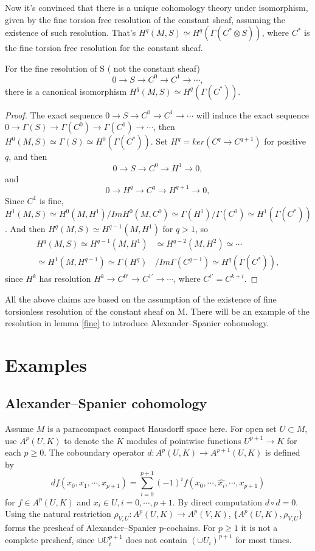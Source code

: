 \documentclass[twoside]{article}
\begin{document}
Now it's convinced that there is a unique cohomology theory under isomorphism, given by the fine torsion free resolution of the constant sheaf, assuming the existence of such resolution. That's $H^q(M,S)\simeq H^q(\Gamma(C^*\otimes S))$, where $C^*$ is the fine torsion free resolution for the constant sheaf.

\begin{theorem}\label{resdef}
For the fine resolution of S ( not the constant sheaf)   $$
0\to S\to C^0\to C^1\to \cdots,
$$
there is a  canonical isomorphism $H^q(M,S)\simeq H^q(\Gamma(C^*))$.
\end{theorem}

\begin{proof}
   The exact sequence $0\to S\to C^0\to C^1\to \cdots$ will induce the exact sequence  $0\to \Gamma(S)\to \Gamma(C^0)\to \Gamma(C^1)\to \cdots$, then $H^0(M,S)\simeq \Gamma(S)\simeq H^0(\Gamma(C^*))$.
  Set $H^q=ker(C^q\to C^{q+1})$ for positive $q$, and then
  $$
  0\to S \to C^0\to H^1\to 0,
  $$
   and
  $$
  0\to H^q\to C^q\to H^{q+1}\to 0,
  $$
 Since $C^1$ is fine, $H^1(M,S)\simeq H^0(M,H^1)/ImH^0(M,C^0)\simeq \Gamma(H^1)/\Gamma(C^0)\simeq H^1(\Gamma(C^*))$. And then
$H^q(M,S)\simeq H^{q-1}(M,H^1)$ for $q>1$, so
$$\begin{aligned}
H^q(M,S)\simeq H^{q-1}(M,H^1)&\simeq H^{q-2}(M,H^2)\simeq \cdots\\
\simeq H^1(M,H^{q-1})\simeq \Gamma(H^q)&/Im\Gamma(C^{q-1})\simeq H^q(\Gamma(C^*)),
\end{aligned}
$$
since $H^k$ has resolution $H^k\to C^{0\prime}\to C^{1\prime}\to \cdots$, where $C^{i\prime}=C^{k+i}$.
\end{proof}



\begin{remark}
  All the above claims are based on the assumption of the existence of fine torsionless resolution of the constant sheaf on M. There will be an example of the resolution in lemma \ref{fine} to introduce Alexander--Spanier cohomology.
\end{remark}
\section{Examples}
\subsection{Alexander--Spanier cohomology}
Assume $M$ is a paracompact compact Hausdorff space here. For open set $U\subset M$,  use $A^{p}(U,K)$ to denote the $K$ modules of pointwise functions $U^{p+1}\to K$ for each $p\geq 0$. The coboundary operator $d\colon A^{p}(U,K)\to A^{p+1}(U,K)$ is defined by 
$$
df(x_0,x_1,\cdots,x_{p+1})=\sum_{i=0}^{p+1}(-1)^if(x_0,\cdots,\hat{x_i},\cdots,x_{p+1})$$ 
for $f\in A^{p}(U,K)$ and $x_i\in U,i=0,\cdots,p+1$. By direct computation $d\circ d=0$. Using the natural restriction $\rho_{V,U}\colon A^{p}(U,K)\to A^{p}(V,K)$, $\{A^{p}(U,K),\rho_{V,U}\}$ forms the presheaf of Alexander--Spanier p-cochains. For $p\geq1$  it is not a complete presheaf, since  $\cup U_i^{p+1}$ does not contain $(\cup U_i)^{p+1}$ for most times.
\end{document}
